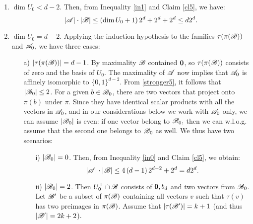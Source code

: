     \begin{enumerate}
        \item\label{caseVerySmallU0} $\operatorname{dim}U_0 < d-2$. Then, from Inequality \ref{in1} and Claim \ref{cl5}, we have:
        \begin{equation}\label{strongWhenLessd-2}
            \left|{\mathscr{A}}\right|\cdot\left|{\mathscr{B}}\right| \leq \left(\operatorname{dim} U_0 + 1\right) 2^d + 2^d + 2^d\leq d 2^d.
        \end{equation}
        \item\label{caseSmallU0} $\operatorname{dim}U_0 = d-2$. Applying the induction hypothesis to the families $\tau(\pi({\mathscr{B}}))$ and ${\mathscr{A}}_0$, we have three cases:
        \begin{enumerate}
            \item[a)] $|\tau(\pi({\mathscr{B}}))|=d-1$. By maximality ${\mathscr{B}}$ contained $\mathbf{0}$, so $\tau(\pi({\mathscr{B}}))$ consists of zero and the basis of $U_0$. The maximality of ${\mathscr{A}}$ now implies that ${\mathscr{A}}_0$ is affinely isomorphic to $\{0,1\}^{d-2}$. From \eqref{stronger5}, it follows that $\left|{\mathscr{B}}_0\right|\leq2$. 
            For a given $b\in{\mathscr{B}}_0$, there are two vectors that project onto $\pi(b)$ under $\pi$. Since they have identical scalar products with all the vectors in ${\mathscr{A}}_0$, and in our considerations below we work with ${\mathscr{A}}_0$ only, we can assume $|{\mathscr{B}}_0|$ is even: if one vector belong to ${\mathscr{B}}_0,$ then we can w.l.o.g. assume that the second one belongs to ${\mathscr{B}}_0$ as well. We thus have two scenarios:
            \begin{enumerate}
                \item[i)] $\left|{\mathscr{B}}_0\right|=0$. Then, from Inequality \ref{in0} and Claim \ref{cl5}, we obtain:
                \begin{equation*}
                    \left|{\mathscr{A}}\right|\cdot\left|{\mathscr{B}}\right|\leq4\left(d-1\right)2^{d-2}+2^d=d 2^d.
                \end{equation*}
                \item[ii)] $\left|{\mathscr{B}}_0\right|=2$. Then $U_0^{\bot} \cap {\mathscr{B}}$ consists of $\mathbf{0}, b_d$ and two vectors from ${\mathscr{B}}_0$. Let ${\mathscr{B}}'$ be a subset of $\pi({\mathscr{B}})$ containing all vectors $v$ such that $\tau(v)$ has two preimages in $\pi({\mathscr{B}})$. Assume that $|\tau({\mathscr{B}}')|=k+1$ (and thus $|{\mathscr{B}}'| = 2k+2$).  %

\end{enumerate}
\end{enumerate}
\end{enumerate}
